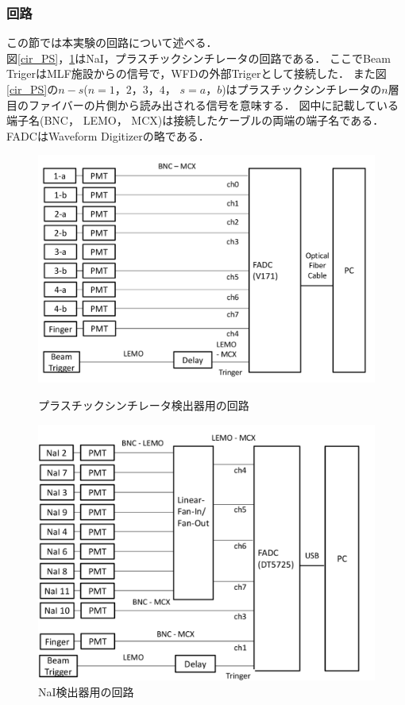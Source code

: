 \subsubsection{回路}
この節では本実験の回路について述べる．\\
図\ref{cir_PS}，\ref{cir_nai}はNaI，プラスチックシンチレータの回路である．
ここでBeam TrigerはMLF施設からの信号で，WFDの外部Trigerとして接続した．
また図\ref{cir_PS}の$n-s$($n=1，2，3，4$， $s=a，b$)はプラスチックシンチレータの$n$層目のファイバーの片側から読み出される信号を意味する．
図中に記載している端子名(BNC， LEMO， MCX)は接続したケーブルの両端の端子名である．FADCはWaveform Digitizerの略である．
\begin{figure}[H]
  \begin{minipage}{0.45\hsize}
    \begin{center}
      \includegraphics[width=1\textwidth]{figure/tajima/circuit_ps_2.png}
      \caption{プラスチックシンチレータ検出器用の回路}
      \label{cir_PS}
    \end{center}
  \end{minipage}
  \hfill
  \begin{minipage}{0.45\hsize}
    \begin{center}
      \includegraphics[width=1\textwidth]{figure/tajima/circuit_nai.png}
      \caption{NaI検出器用の回路}
      \label{cir_nai}
    \end{center}
  \end{minipage}
\end{figure}
